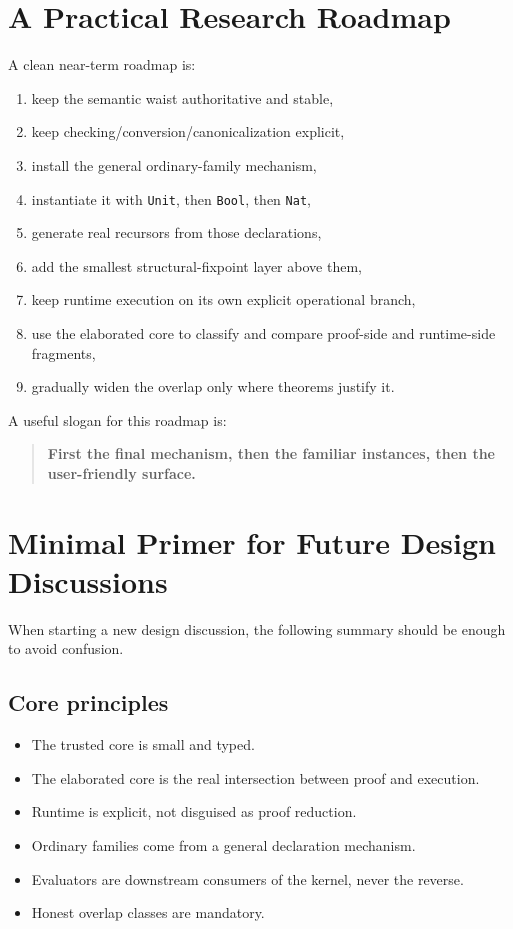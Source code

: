 \documentclass[11pt]{article}
\begin{document}
\section{A Practical Research Roadmap}
A clean near-term roadmap is:
\begin{enumerate}[label=(\arabic*)]
  \item keep the semantic waist authoritative and stable,
  \item keep checking/conversion/canonicalization explicit,
  \item install the general ordinary-family mechanism,
  \item instantiate it with \texttt{Unit}, then \texttt{Bool}, then \texttt{Nat},
  \item generate real recursors from those declarations,
  \item add the smallest structural-fixpoint layer above them,
  \item keep runtime execution on its own explicit operational branch,
  \item use the elaborated core to classify and compare proof-side and runtime-side fragments,
  \item gradually widen the overlap only where theorems justify it.
\end{enumerate}

A useful slogan for this roadmap is:
\begin{quote}
\textbf{First the final mechanism, then the familiar instances, then the user-friendly surface.}
\end{quote}

\section{Minimal Primer for Future Design Discussions}
When starting a new design discussion, the following summary should be enough to avoid confusion.

\subsection*{Core principles}
\begin{itemize}
  \item The trusted core is small and typed.
  \item The elaborated core is the real intersection between proof and execution.
  \item Runtime is explicit, not disguised as proof reduction.
  \item Ordinary families come from a general declaration mechanism.
  \item Evaluators are downstream consumers of the kernel, never the reverse.
  \item Honest overlap classes are mandatory.
\end{itemize}
\end{document}
